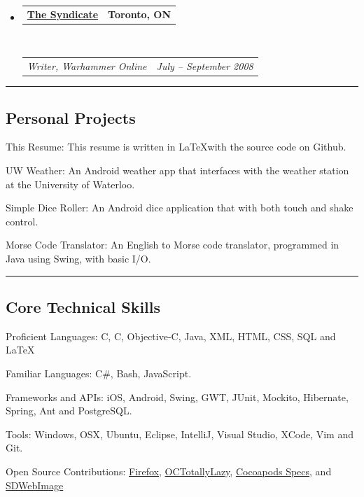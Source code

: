 \documentclass[10pt,letterpaper]{article}
\makeatletter
\newenvironment{indentsection}[1]%
{\begin{list}{}%
	{\setlength{\leftmargin}{#1}}%
	\item[]%
}
{\end{list}}
\newcommand{\headerrow}[2]
{\begin{tabular*}{\linewidth}{l@{\extracolsep{\fill}}r}
	#1 &
	#2 \\
\end{tabular*}}
\newcommand{\CPP}
{C\nolinebreak[4]\hspace{-.05em}\raisebox{.22ex}{\footnotesize\bf ++}}
\makeatother
\begin{document}
\begin{itemize}
	\item
	\headerrow
		{\textbf{\href{https://llts.org}{The Syndicate}}}
		{\textbf{Toronto, ON}}
	\\
	\headerrow
		{\emph{Writer, Warhammer Online}}
		{\emph{July -- September 2008}}

\end{itemize}

\hrule
\vspace{-0.4em}
\subsection*{Personal Projects}
	\begin{indentsection}{\parindent}
	\begin{description*}
		\item[This Resume:] This resume is written in \LaTeX with the source code on Github.
		\item[UW Weather:] An Android weather app that interfaces with the weather station at the University of Waterloo.
		\item[Simple Dice Roller:] An Android dice application that with both touch and shake control.	
		\item[Morse Code Translator:] An English to Morse code translator, programmed in Java using Swing, with basic I/O.
	\end{description*}
	\end{indentsection}

\hrule
\vspace{-0.4em}
\subsection*{Core Technical Skills}

\begin{indentsection}{\parindent}
\begin{description*}
	\item[Proficient Languages:]
	C, \CPP, Objective-C, Java, XML, HTML, CSS, SQL and \LaTeX
	\item[Familiar Languages:]
	C\#, Bash, JavaScript.
	\item[Frameworks and APIs:]
	iOS, Android, Swing, GWT, JUnit, Mockito, Hibernate, Spring, Ant and PostgreSQL.
	\item[Tools:]
	Windows, OSX, Ubuntu, Eclipse, IntelliJ, Visual Studio, XCode, Vim and Git.
	\item[Open Source Contributions:]
	\href{https://mozilla.org}{Firefox}, \href{https://github.com/stuartervine/octotallylazy}{OCTotallyLazy}, \href{https://github.com/CocoaPods/Specs}{Cocoapods Specs}, and \href{https://github.com/rs/sdwebimage}{SDWebImage}
\end{description*}
\end{indentsection}
\end{document}
